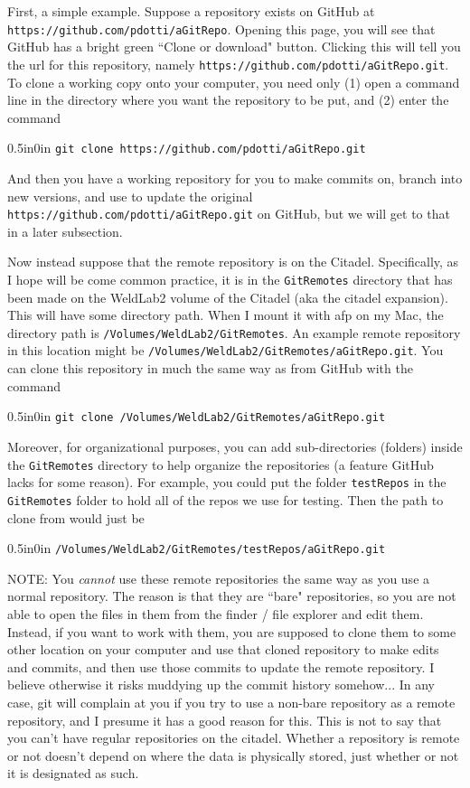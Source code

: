 \documentclass[11pt]{article}
\newcommand{\code}[1]{\begin{adjustwidth}{0.5in}{0in}
    \texttt{#1}
    \end{adjustwidth}}
\begin{document}
First, a simple example.  Suppose a repository exists on GitHub at \texttt{https://github.com/pdotti/aGitRepo}.  Opening this page, you will see that GitHub has a bright green ``Clone or download" button.  Clicking this will tell you the url for this repository, namely \texttt{https://github.com/pdotti/aGitRepo.git}.  To clone a working copy onto your computer, you need only (1) open a command line in the directory where you want the repository to be put, and (2) enter the command

\code{git clone https://github.com/pdotti/aGitRepo.git}

And then you have a working repository for you to make commits on, branch into new versions, and use to update the original \texttt{https://github.com/pdotti/aGitRepo.git} on GitHub, but we will get to that in a later subsection.

Now instead suppose that the remote repository is on the Citadel.  Specifically, as I hope will be come common practice, it is in the \texttt{GitRemotes} directory that has been made on the WeldLab2 volume of the Citadel (aka the citadel expansion).  This will have some directory path.  When I mount it with afp on my Mac, the directory path is \texttt{/Volumes/WeldLab2/GitRemotes}.  An example remote repository in this location might be \texttt{/Volumes/WeldLab2/GitRemotes/aGitRepo.git}.  You can clone this repository in much the same way as from GitHub with the command

\code{git clone /Volumes/WeldLab2/GitRemotes/aGitRepo.git}

Moreover, for organizational purposes, you can add sub-directories (folders) inside the \texttt{GitRemotes} directory to help organize the repositories (a feature GitHub lacks for some reason).  For example, you could put the folder \texttt{testRepos} in the \texttt{GitRemotes} folder to hold all of the repos we use for testing.  Then the path to clone from would just be
 
\code{/Volumes/WeldLab2/GitRemotes/testRepos/aGitRepo.git}

NOTE: You \emph{cannot} use these remote repositories the same way as you use a normal repository.  The reason is that they are ``bare" repositories, so you are not able to open the files in them from the finder / file explorer and edit them.  Instead, if you want to work with them, you are supposed to clone them to some other location on your computer and use that cloned repository to make edits and commits, and then use those commits to update the remote repository.  I believe otherwise it risks muddying up the commit history somehow... In any case, git will complain at you if you try to use a non-bare repository as a remote repository, and I presume it has a good reason for this.  This is not to say that you can't have regular repositories on the citadel.  Whether a repository is remote or not doesn't depend on where the data is physically stored, just whether or not it is designated as such.
\end{document}
